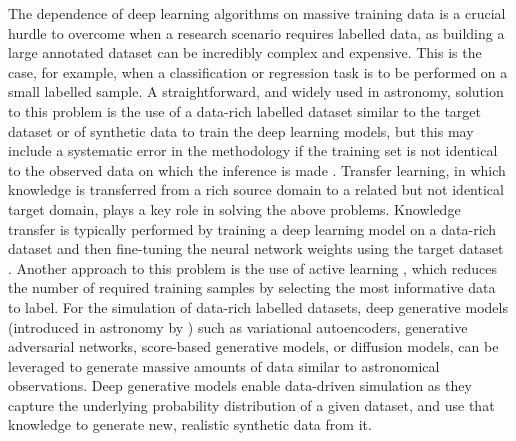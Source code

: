 The dependence of deep learning algorithms on massive training data is a crucial hurdle to overcome when a research scenario requires labelled data, as building a large annotated dataset can be incredibly complex and expensive. This is the case, for example, when a classification or regression task is to be performed on a small labelled sample. A straightforward, and widely used in astronomy, solution to this problem is the use of a data-rich labelled dataset similar to the target dataset or of synthetic data to train the deep learning models, but this may include a systematic error in the methodology if the training set is not identical to the observed data on which the inference is made \citep{pass20}. Transfer learning, in which knowledge is transferred from a rich source domain to a related but not identical target domain, plays a key role in solving the above problems. Knowledge transfer is typically performed by training a deep learning model on a data-rich dataset and then fine-tuning the neural network weights using the target dataset \citep{dominguez2018,walmsley2022,bello2023,masbuitrago2024}. Another approach to this problem is the use of active learning \citep{walmsley2020,stevens2021}, which reduces the number of required training samples by selecting the most informative data to label. For the simulation of data-rich labelled datasets, deep generative models (introduced in astronomy by \citealt{regier2015}) such as variational autoencoders, generative adversarial networks, score-based generative models, or diffusion models, can be leveraged to generate massive amounts of data similar to astronomical observations. Deep generative models enable data-driven simulation as they capture the underlying probability distribution of a given dataset, and use that knowledge to generate new, realistic synthetic data from it.

